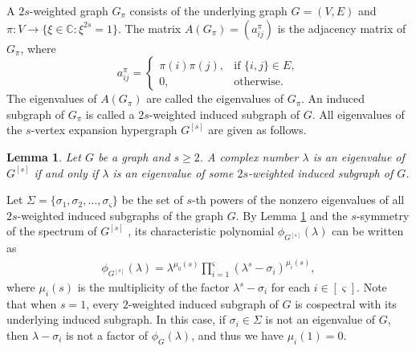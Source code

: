 \documentclass{article}
\newtheorem{lem}[thm]{Lemma}
\begin{document}
A $2s$-weighted graph $G_{\pi}$ consists of the underlying graph $G=(V,E)$ and $\pi:V\rightarrow\{\xi\in\mathbb{C}:\xi^{2s}=1\}$.
The matrix $A(G_{\pi})=(a_{ij}^{\pi})$ is the adjacency matrix of $G_{\pi}$,
where
\begin{equation*}
a_{ij}^{\pi}=\begin{cases}
\pi(i)\pi(j),&\mbox{if $\{i,j\} \in E$},\\
0,&\mbox{otherwise}.
\end{cases}
\end{equation*}
The eigenvalues of $A(G_{\pi})$ are called the eigenvalues of $G_{\pi}$.
An induced subgraph of $G_{\pi}$ is called a $2s$-weighted induced subgraph of $G$.
All eigenvalues of the $s$-vertex expansion hypergraph $G^{[s]}$ are given as follows.

\begin{lem}\citep[Theorem 3.1]{lin2026eigenvalue}\label{yinli9}
Let $G$ be a graph and $s\geq2$.
A complex number $\lambda$ is an eigenvalue of $G^{[s]}$ if and only if
$\lambda$ is an eigenvalue of some $2s$-weighted induced subgraph of $G$.
\end{lem}

Let $\Sigma=\{\sigma_{1}, \sigma_{2}, \ldots , \sigma_{\varsigma}\}$ be the set of $s$-th powers of the nonzero eigenvalues of all $2s$-weighted induced subgraphs of the graph $G$.
By Lemma \ref{yinli9} and the $s$-symmetry of the spectrum of $G^{[s]}$ \cite{fan2019spectral},
its characteristic polynomial $\phi_{G^{[s]}}(\lambda)$ can be written as
\begin{align}\label{eq12}
\phi_{G^{[s]}}(\lambda)=\lambda^{\mu_{0}(s)}\prod_{i=1}^{\varsigma}\left(\lambda^{s}-\sigma_{i}\right)^{\mu_{i}(s)},
\end{align}
where $\mu_{i}(s)$ is the multiplicity of the factor $\lambda^{s}-\sigma_{i}$ for each $i \in [\varsigma]$.
Note that when $s=1$,
every $2$-weighted induced subgraph of $G$ is cospectral with its underlying induced subgraph.
In this case,
if $\sigma_{i} \in \Sigma$ is not an eigenvalue of $G$,
then $\lambda-\sigma_{i}$ is not a factor of $\phi_{G}(\lambda)$,
and thus we have $\mu_{i}(1)=0$.
\end{document}
